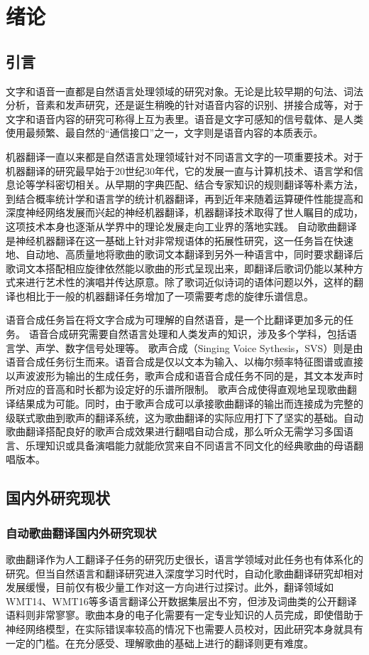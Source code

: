 \chapter{绪论}
\section{引言}
文字和语音一直都是自然语言处理领域的研究对象。无论是比较早期的句法、词法分析，音素和发声研究，还是诞生稍晚的针对语音内容的识别、拼接合成等，对于文字和语音内容的研究可称得上互为表里。语音是文字可感知的信号载体、是人类使用最频繁、最自然的``通信接口''之一，文字则是语音内容的本质表示。

机器翻译一直以来都是自然语言处理领域针对不同语言文字的一项重要技术。对于机器翻译的研究最早始于20世纪30年代，它的发展一直与计算机技术、语言学和信息论等学科密切相关。从早期的字典匹配、结合专家知识的规则翻译等朴素方法，到结合概率统计学和语言学的统计机器翻译，再到近年来随着运算硬件性能提高和深度神经网络发展而兴起的神经机器翻译，机器翻译技术取得了世人瞩目的成功，这项技术本身也逐渐从学界中的理论发展走向工业界的落地实践。
自动歌曲翻译是神经机器翻译在这一基础上针对非常规语体的拓展性研究，这一任务旨在快速地、自动地、高质量地将歌曲的歌词文本翻译到另外一种语言中，同时要求翻译后歌词文本搭配相应旋律依然能以歌曲的形式呈现出来，即翻译后歌词仍能以某种方式来进行艺术性的演唱并传达原意。除了歌词近似诗词的语体问题以外，这样的翻译也相比于一般的机器翻译任务增加了一项需要考虑的旋律乐谱信息。

语音合成任务旨在将文字合成为可理解的自然语音，是一个比翻译更加多元的任务。
语音合成研究需要自然语言处理和人类发声的知识，涉及多个学科，包括语言学、声学、数字信号处理等。
歌声合成（Singing Voice Sythesis，SVS）则是由语音合成任务衍生而来。语音合成是仅以文本为输入、以梅尔频率特征图谱或直接以声波波形为输出的生成任务，歌声合成和语音合成任务不同的是，其文本发声时所对应的音高和时长都为设定好的乐谱所限制。
歌声合成使得直观地呈现歌曲翻译结果成为可能。同时，由于歌声合成可以承接歌曲翻译的输出而连接成为完整的级联式歌曲到歌声的翻译系统，这为歌曲翻译的实际应用打下了坚实的基础。自动歌曲翻译搭配良好的歌声合成效果进行翻唱自动合成，那么听众无需学习多国语言、乐理知识或具备演唱能力就能欣赏来自不同语言不同文化的经典歌曲的母语翻唱版本。
\section{国内外研究现状}
\subsection{自动歌曲翻译国内外研究现状}
歌曲翻译作为人工翻译子任务的研究历史很长，语言学领域对此任务也有体系化的研究。但当自然语言和翻译研究进入深度学习时代时，自动化歌曲翻译研究却相对发展缓慢，目前仅有极少量工作\citep{gagast}对这一方向进行过探讨。此外，翻译领域如WMT14、WMT16等多语言翻译公开数据集层出不穷，但涉及词曲类的公开翻译语料则非常寥寥。歌曲本身的电子化需要有一定专业知识的人员完成，即使借助于神经网络模型，在实际错误率较高的情况下也需要人员校对，因此研究本身就具有一定的门槛。在充分感受、理解歌曲的基础上进行的翻译则更有难度。
